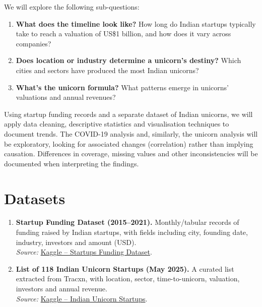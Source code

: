 \documentclass[10pt,a4paper]{article}
\begin{document}
We will explore the following sub-questions:

\begin{enumerate}
    \item \textbf{What does the timeline look like?} How long do Indian
    startups typically take to reach a valuation of US\$1 billion,
    and how does it vary across companies?

    \item \textbf{Does location or industry determine a unicorn's
    destiny?} Which cities and sectors have produced the most
    Indian unicorns?

    \item \textbf{What's the unicorn formula?} What patterns emerge
    in unicorns' valuations and annual revenues?
\end{enumerate}

Using startup funding records and a separate dataset of Indian unicorns,
we will apply data cleaning, descriptive statistics and visualisation
techniques to document trends. The COVID-19 analysis and, similarly,
the unicorn analysis will be exploratory, looking for associated
changes (correlation) rather than implying causation. Differences in
coverage, missing values and other inconsistencies will be documented
when interpreting the findings.


\section{Datasets}
\begin{enumerate}
  \item \textbf{Startup Funding Dataset (2015--2021).} Monthly/tabular records of funding raised by Indian startups, with fields including city, founding date, industry, investors and amount (USD).\\
  \textit{Source:} \href{https://www.kaggle.com/datasets/arpan129/startups-funding-dataset}{Kaggle -- Startups Funding Dataset}.
  \item \textbf{List of 118 Indian Unicorn Startups (May 2025).} A curated list extracted from Tracxn, with location, sector, time-to-unicorn, valuation, investors and annual revenue.\\
  \textit{Source:} \href{https://www.kaggle.com/datasets/srisankargiri/list-of-118-unicorn-startups-in-indiamay-2025}{Kaggle -- Indian Unicorn Startups}.
\end{enumerate}
\end{document}
